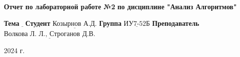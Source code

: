 \begin{titlepage}
	
	\begin{center}
		\noindent\begin{minipage}{1.3\textwidth}\centering
		\Large\textbf{   Отчет по лабораторной работе №2}\newline
		\textbf{по дисциплине "Анализ Алгоритмов"}\newline\newline\newline
		\end{minipage}
	\end{center}
	
	\noindent\textbf{Тема} 			$\underline{\text{}}$\newline\newline
	\noindent\textbf{Студент} 		$\underline{\text{Козырнов А.Д.}}$\newline\newline
	\noindent\textbf{Группа} 		$\underline{\text{ИУ7-52Б}}$\newline\newline
	\noindent\textbf{Преподаватель} $\underline{\text{Волкова Л. Л., Строганов Д.В.}}$\newline
	
	\begin{center}
        \vfill
		2024 г.
	\end{center}
	\restoregeometry
\end{titlepage}
